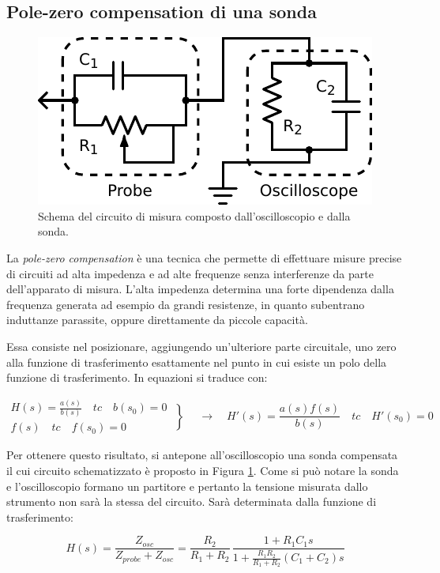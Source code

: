 \subsection{Pole-zero compensation di una sonda}

\begin{figure}
\centering
\includegraphics[width=.35\textwidth]{../E08/latex/probe.pdf}
\caption{Schema del circuito di misura composto dall'oscilloscopio e dalla sonda.}
\label{cir8:probe}
\end{figure}

La \textit{pole-zero compensation} è una tecnica che permette di effettuare misure precise di circuiti ad alta impedenza e ad alte frequenze senza interferenze da parte dell'apparato di misura.
L'alta impedenza determina una forte dipendenza dalla frequenza generata ad esempio da grandi resistenze, in quanto subentrano induttanze parassite, oppure direttamente da piccole capacità.

Essa consiste nel posizionare, aggiungendo un'ulteriore parte circuitale, uno zero alla funzione di trasferimento esattamente nel punto in cui esiste un polo della funzione di trasferimento.
In equazioni si traduce con:

\[
  \begin{array}{lr}
H(s) = \frac{a(s)}{b(s)} \quad tc \quad b(s_0) = 0 \\
f(s) \quad tc \quad f(s_0) = 0
  \end{array}\left\}
\quad \longrightarrow \quad H'(s) = \frac{a(s)f(s)}{b(s)} \quad tc \quad H'(s_0) = 0
\right.
\]

Per ottenere questo risultato, si antepone all'oscilloscopio una sonda compensata il cui circuito schematizzato è proposto in Figura \ref{cir8:probe}.
Come si può notare la sonda e l'oscilloscopio formano un partitore e pertanto la tensione misurata dallo strumento non sarà la stessa del circuito.
Sarà determinata dalla funzione di trasferimento:

\begin{equation}
H(s)=\frac{Z_{osc}}{Z_{probe}+Z_{osc}} = \frac{R_2}{R_1+R_2}\,\frac{1+R_1C_1s}{1+\frac{R_1R_2}{R_1+R_2}(C_1+C_2)s}
\end{equation}

